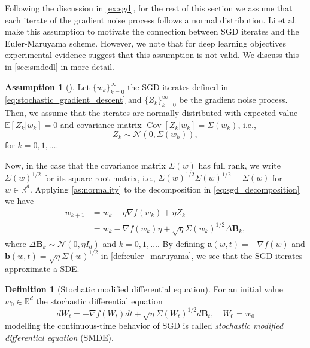 \documentclass[12pt]{article}
\theoremstyle{definition}
\newtheorem{definition}[definition]{Definition}
\newtheorem{assumption}[assumption]{Assumption}
\numberwithin{equation}{section}
\newcommand{\R}{\mathbb{R}}
\newcommand{\CN}{\mathcal{N}}
\newcommand{\ev}[1]{\mathbb{E}\left[{#1}\right]}
\DeclareMathOperator{\Cov}{Cov}
\begin{document}
Following the discussion in \autoref{ex:sgd}, for the rest of this section we assume that each iterate of the gradient noise process follows a normal distribution. Li et al.\ \cite{liStochasticModifiedEquations2019} make this assumption to motivate the connection between SGD iterates and the Euler-Maruyama scheme. However, we note that for deep learning objectives experimental evidence suggest that this assumption is not valid. We discuss this in \autoref{sec:smdedl} in more detail.
\begin{assumption}[]
  \label{as:normality}
  Let $\{w_k\}_{k=0}^\infty$ the SGD iterates defined in \eqref{eq:stochastic_gradient_descent} and $\{Z_k\}_{k=0}^\infty$ be the gradient noise process. Then, we assume that the iterates are normally distributed with expected value $\ev{Z_k|w_k} = 0$ and covariance matrix $\Cov \left[Z_k | w_k\right] = \Sigma(w_k)$, i.e.,
  \begin{equation*}
    Z_k \sim \CN(0, \Sigma(w_k)),
  \end{equation*}
for $k=0,1,\dots$.  
\end{assumption}
Now, in the case that the covariance matrix $\Sigma(w)$ has full rank, we write $\Sigma(w)^{1/2}$ for its square root matrix, i.e., $\Sigma(w)^{1/2}\Sigma(w)^{1/2} = \Sigma(w)$ for $w\in \R^d$. Applying \autoref{as:normality} to the decomposition in \eqref{eq:sgd_decomposition} we have
\begin{equation}
  \label{eq:sgd_normal_decomposition}
  \begin{split}
    w_{k+1} &= w_{k} - \eta \nabla f(w_{k}) + \eta Z_k \\
  &= w_k - \nabla f(w_k) \eta + \sqrt{\eta}\Sigma(w_k)^{1/2}\Delta \mathbf{B}_k,
  \end{split}
\end{equation}
where $\Delta \mathbf{B}_k \sim \CN(0,\eta I_d)$ and $k=0,1,\dots$. 
By defining $\mathbf{a}(w,t) = -\nabla f(w)$ and $\mathbf{b}(w,t) = \sqrt{\eta}\Sigma(w)^{1/2}$ in \autoref{def:euler_maruyama}, we see that the SGD iterates approximate a SDE. 
\begin{definition}[Stochatic modified differential equation]
  For an initial value $w_0 \in \R^d$ the stochastic differential equation
  \begin{equation}
    \label{eq:first_oder_smde}
    dW_t = -\nabla f(W_t)dt + \sqrt{\eta} \Sigma(W_t)^{1/2}d\mathbf{B}_t, \quad W_0 = w_0
  \end{equation}
  modelling the continuous-time behavior of SGD is called \emph{stochastic modified differential equation} (SMDE).
\end{definition}
\end{document}
